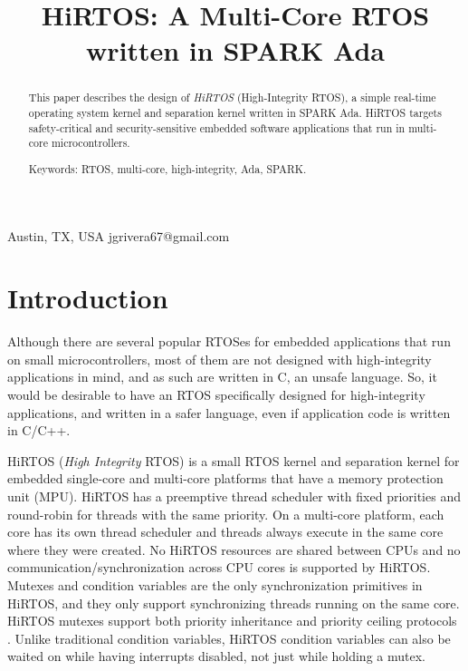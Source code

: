 \documentclass{AUJarticle}
\begin{document}
\title{HiRTOS: A Multi-Core RTOS written in SPARK Ada}

{Austin, TX, USA}
{jgrivera67@gmail.com}



\thispagestyle{plain}

\maketitle

\begin{abstract}

This paper describes the design of \emph{HiRTOS} (High-Integrity RTOS),
a simple real-time operating system kernel and separation kernel written in SPARK Ada.
HiRTOS targets safety-critical and security-sensitive embedded software applications
that run in multi-core microcontrollers.

Keywords: RTOS, multi-core, high-integrity, Ada, SPARK.

\end{abstract}

\section{Introduction}

Although there are several popular RTOSes for embedded applications that run on small
microcontrollers, most of them are not designed with high-integrity applications
in mind, and as such are written in C, an unsafe language. So, it would be desirable
to have an RTOS specifically designed for high-integrity applications, and written in a safer
language, even if application code is written in C/C++.

HiRTOS (\emph{High Integrity} RTOS) \cite{HiRTOS} is a small RTOS 
kernel and separation kernel for embedded single-core and multi-core 
platforms that have a memory protection unit (MPU).
HiRTOS has a preemptive thread scheduler with fixed priorities and
round-robin for threads with the same priority.
On a multi-core platform, each core has its own thread scheduler and threads
always execute in the same core where they were created. No HiRTOS resources
are shared between CPUs and no communication/synchronization across CPU
cores is supported by HiRTOS. Mutexes and condition variables \cite{mutexAndCV}
are the only synchronization primitives in HiRTOS, and they only support
synchronizing threads running on the same core. HiRTOS mutexes support both
priority inheritance and priority ceiling protocols \cite{prioCeiling}.
Unlike traditional condition variables, HiRTOS condition variables
can also be waited on while having interrupts disabled, not just while holding
a mutex.
\end{document}
